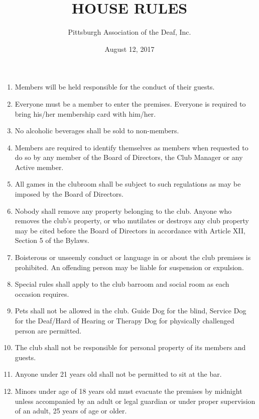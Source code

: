 \documentclass[12pt,letterpaper]{article}
\title{HOUSE RULES}
\author{Pittsburgh Association of the Deaf, Inc.}
\date{August 12, 2017}
\begin{document}
\maketitle

\begin{enumerate}
\item Members will be held responsible for the conduct of their guests.

\item Everyone must be a member to enter the premises. Everyone is required to
bring his/her membership card with him/her.

\item No alcoholic beverages shall be sold to non-members.

\item Members are required to identify themselves as members when requested to do
so by any member of the Board of Directors, the Club Manager or any Active
member.

\item All games in the clubroom shall be subject to such regulations as may be
imposed by the Board of Directors.

\item Nobody shall remove any property belonging to the club. Anyone who removes
the club’s property, or who mutilates or destroys any club property may be
cited before the Board of Directors in accordance with Article XII, Section 5 of
the Bylaws.

\item Boisterous or unseemly conduct or language in or about the club premises is
prohibited. An offending person may be liable for suspension or expulsion.

\item Special rules shall apply to the club barroom and social room as each occasion
requires.

\item Pets shall not be allowed in the club. Guide Dog for the blind, Service Dog for
the Deaf/Hard of Hearing or Therapy Dog for physically challenged person are
permitted.

\item The club shall not be responsible for personal property of its members and
guests.

\item Anyone under 21 years old shall not be permitted to sit at the bar.

\item Minors under age of 18 years old must evacuate the premises by midnight
unless accompanied by an adult or legal guardian or under proper supervision
of an adult, 25 years of age or older.


\end{enumerate}
\end{document}
